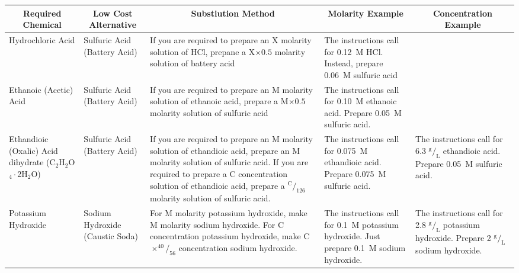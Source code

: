 \begin{landscape}
\thispagestyle{empty}

\begin{table}
\centering

\begin{tabular}{| p{3.5cm} | p{4cm} | p{8cm} | p{4cm} | p{4cm} |}
\hline

\multicolumn{1}{|c}{\textbf{Required Chemical}} & 
\multicolumn{1}{|c}{\textbf{Low Cost Alternative}} & 
\multicolumn{1}{|c}{\textbf{Substiution Method}} & 
\multicolumn{1}{|c}{\textbf{Molarity Example}} & 
\multicolumn{1}{|c|}{\textbf{Concentration Example}} \\ \hline

Hydrochloric Acid & 
Sulfuric Acid (Battery Acid) & 
If you are required to prepare an X molarity solution of HCl, prepane a X$\times 0.5$ molarity solution of battery acid & 
The instructions call for 0.12~M HCl. Instead, prepare 0.06~M sulfuric acid & 
 \\ \hline

Ethanoic (Acetic) Acid & 
Sulfuric Acid (Battery Acid) & 
If you are required to prepare an M molarity solution of ethanoic acid, prepare a M$\times 0.5$ molarity solution of sulfuric acid & 
The instructions call for 0.10~M ethanoic acid. Prepare 0.05~M sulfuric acid. & 
 \\ \hline

Ethandioic (Oxalic) Acid dihydrate (C$_{2}$H$_{2}$O$_{4} \cdot$2H$_{2}$O) & 
Sulfuric Acid (Battery Acid) & 
If you are required to prepare an M molarity solution of ethandioic acid, prepare an M molarity solution of sulfuric acid. If you are required to prepare a C concentration solution of ethandioic acid, prepare a $^\text{C}/_{126}$ molarity solution of sulfuric acid. & 
The instructions call for 0.075~M ethandioic acid. Prepare 0.075~M sulfuric acid. & 
The instructions call for 6.3 $^\text{g}/_\text{L}$ ethandioic acid. Prepare 0.05~M sulfuric acid. \\ \hline

Potassium Hydroxide & 
Sodium Hydroxide (Caustic Soda) & 
For M molarity potassium hydroxide, make M molarity sodium hydroxide. For C concentration potassium hydroxide, make C$\times ^{40}/_{56}$ concentration sodium hydroxide. & 
The instructions call for 0.1~M potassium hydroxide. Just prepare 0.1~M sodium hydroxide. &
The instructions call for 2.8 $^\text{g}/_\text{L}$ potassium hydroxide. Prepare 2 $^\text{g}/_\text{L}$ sodium hydroxide. \\ \hline


\end{tabular}
\end{table}
\end{landscape}
